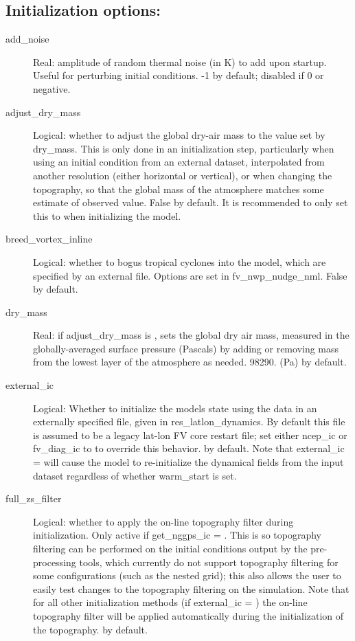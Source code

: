 \documentclass[12pt,letterpaper]{book}
\begin{document}
\subsection{Initialization options:}

\begin{description}

\item[add\_noise] Real: amplitude of random thermal noise (in K) to add upon startup. Useful for perturbing initial conditions. 
-1 by default; disabled if 0 or negative. 


\item[adjust\_dry\_mass] Logical: whether to adjust the global dry-air mass to the value set by dry\_mass. This is only done in an initialization step, particularly when using an initial condition from an external dataset, interpolated from another resolution 
(either horizontal or vertical), or when changing the topography, so that the global mass of the atmosphere matches some estimate of observed value. False by default. It is recommended to only set this to \true  when initializing the model. 


\item[breed\_vortex\_inline] Logical: whether to bogus tropical cyclones into the model, which are specified by an external file. Options are set in fv\_nwp\_nudge\_nml. False by default. 


\item[dry\_mass] Real: if adjust\_dry\_mass is \true , sets the global dry air mass, measured in the globally-averaged surface pressure (Pascals) by adding or removing mass from the lowest layer of the atmosphere as needed. 
98290. (Pa) by default. 


\item[external\_ic] Logical: Whether to initialize the models state using the data in an externally specified file, given in res\_latlon\_dynamics. By default this file is assumed to be a legacy lat-lon FV core restart file; set either ncep\_ic or fv\_diag\_ic to \true  to override this behavior. \false  by default. Note that external\_ic 
= \true  will cause the model to re-initialize the dynamical fields from the input dataset regardless of whether warm\_start is set. 

\item[full\_zs\_filter] Logical: whether to apply the on-line topography filter during initialization. Only active if get\_nggps\_ic = \true  . This is so topography filtering can be performed on the initial conditions output by the pre-processing tools, which currently do not support topography filtering for some configurations (such as the nested grid); this also allows the user to easily test changes to the topography filtering on the simulation. Note that for all other initialization methods (if external\_ic = \true ) the on-line topography filter will be applied automatically during the initialization of the topography. \false  by default. 


\end{description}
\end{document}
